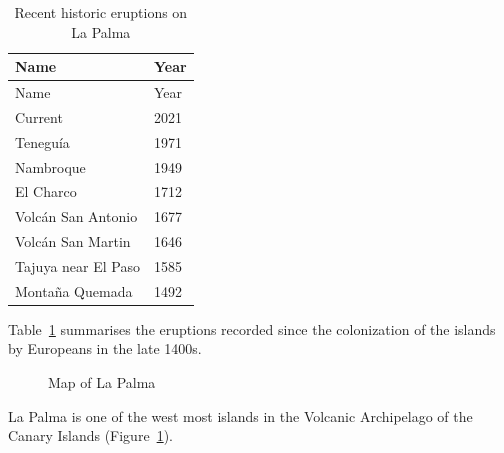 \documentclass[
]{agujournal2019}
\begin{document}
\begin{longtable}[]{@{}ll@{}}
\caption{Recent historic eruptions on La
Palma}\label{tbl-history}\tabularnewline
\toprule\noalign{}
Name & Year \\
\midrule\noalign{}
\endfirsthead
\toprule\noalign{}
Name & Year \\
\midrule\noalign{}
\endhead
\bottomrule\noalign{}
\endlastfoot
Current & 2021 \\
Teneguía & 1971 \\
Nambroque & 1949 \\
El Charco & 1712 \\
Volcán San Antonio & 1677 \\
Volcán San Martin & 1646 \\
Tajuya near El Paso & 1585 \\
Montaña Quemada & 1492 \\
\end{longtable}

Table~\ref{tbl-history} summarises the eruptions recorded since the
colonization of the islands by Europeans in the late 1400s.

\begin{figure}


\caption{\label{fig-map}Map of La Palma}

\end{figure}%

La Palma is one of the west most islands in the Volcanic Archipelago of
the Canary Islands (Figure~\ref{fig-map}).
\end{document}

